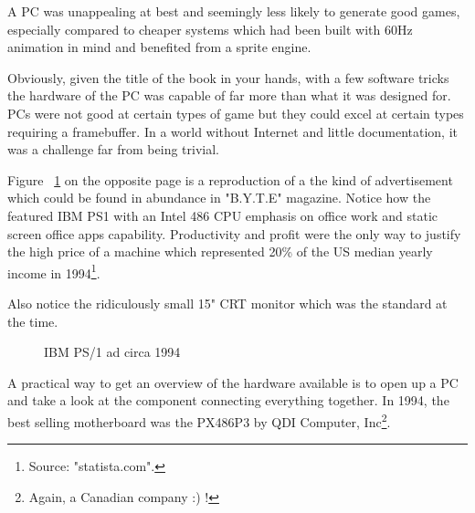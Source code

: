 \par
 A PC was unappealing at best and seemingly less likely to generate good games, especially compared to cheaper systems which had been built with 60Hz animation in mind and benefited from a sprite engine.\\
 \par
  Obviously, given the title of the book in your hands, with a few software tricks the hardware of the PC was capable of far more than what it was designed for. PCs were not good at certain types of game but they could excel at certain types requiring a framebuffer. In a world without Internet and little documentation, it was a challenge far from being trivial.\\
\par

Figure ~\ref{ibm_ps1_top} on the opposite page is a reproduction of a the kind of advertisement which could be found in abundance in "B.Y.T.E" magazine. Notice how the featured IBM PS1 with an Intel 486 CPU emphasis on office work and static screen office apps capability. Productivity and profit were the only way to justify the high price of a machine which represented 20\% of the US median yearly income in 1994\footnote{Source: "statista.com".}.\\
\par
Also notice the ridiculously small 15" CRT monitor which was the standard at the time.
\par
\begin{figure}[H] \centering
{}
\caption{IBM PS/1 ad circa 1994}
\label{ibm_ps1_top}
\end{figure}


















\cleartoleftpage
 
A practical way to get an overview of the hardware available is to open up a PC and take a look at the component connecting everything together. In 1994, the best selling motherboard was the PX486P3 by QDI Computer, Inc\footnote{Again, a Canadian company :) !}.\\

